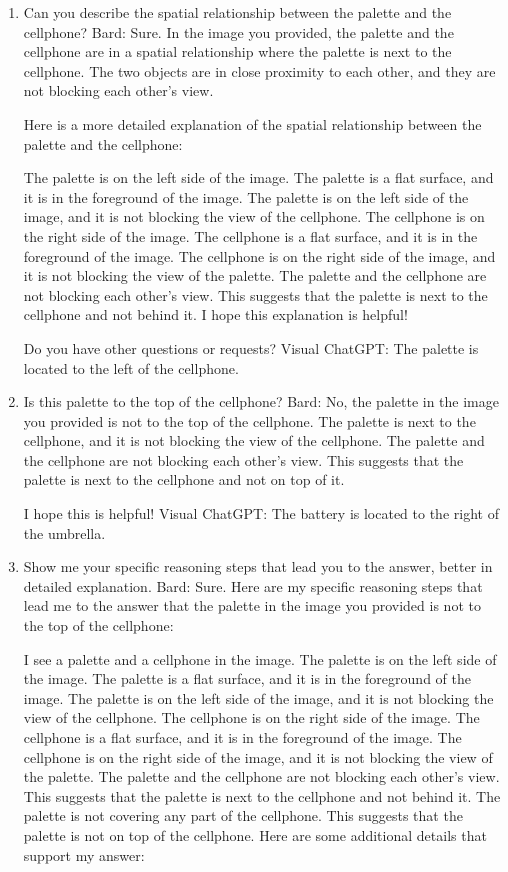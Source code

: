 \begin{enumerate}
    \item Can you describe the spatial relationship between the palette and the cellphone?
    \subitem Bard: 
    Sure. In the image you provided, the palette and the cellphone are in a spatial relationship where the palette is next to the cellphone. The two objects are in close proximity to each other, and they are not blocking each other's view.
    
    Here is a more detailed explanation of the spatial relationship between the palette and the cellphone:
    
    The palette is on the left side of the image. The palette is a flat surface, and it is in the foreground of the image. The palette is on the left side of the image, and it is not blocking the view of the cellphone.
    The cellphone is on the right side of the image. The cellphone is a flat surface, and it is in the foreground of the image. The cellphone is on the right side of the image, and it is not blocking the view of the palette.
    The palette and the cellphone are not blocking each other's view. This suggests that the palette is next to the cellphone and not behind it.
    I hope this explanation is helpful!
    
    Do you have other questions or requests?
    \subitem Visual ChatGPT: The palette is located to the left of the cellphone.
    \item Is this palette to the top of the cellphone?
    \subitem Bard: No, the palette in the image you provided is not to the top of the cellphone. The palette is next to the cellphone, and it is not blocking the view of the cellphone. The palette and the cellphone are not blocking each other's view. This suggests that the palette is next to the cellphone and not on top of it.

    I hope this is helpful!
    \subitem Visual ChatGPT: The battery is located to the right of the umbrella.
    \item Show me your specific reasoning steps that lead you to the answer, better in detailed explanation.
    \subitem Bard: 
    Sure. Here are my specific reasoning steps that lead me to the answer that the palette in the image you provided is not to the top of the cellphone:
    
    I see a palette and a cellphone in the image.
    The palette is on the left side of the image. The palette is a flat surface, and it is in the foreground of the image. The palette is on the left side of the image, and it is not blocking the view of the cellphone.
    The cellphone is on the right side of the image. The cellphone is a flat surface, and it is in the foreground of the image. The cellphone is on the right side of the image, and it is not blocking the view of the palette.
    The palette and the cellphone are not blocking each other's view. This suggests that the palette is next to the cellphone and not behind it.
    The palette is not covering any part of the cellphone. This suggests that the palette is not on top of the cellphone.
    Here are some additional details that support my answer:
    

\end{enumerate}
